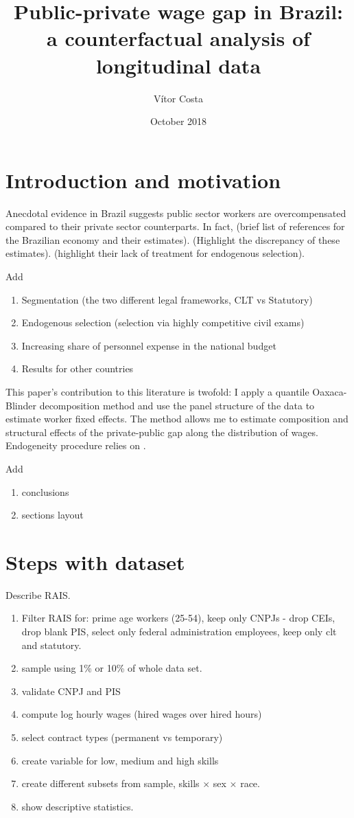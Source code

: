 \documentclass{article}
\title{Public-private wage gap in Brazil: a counterfactual analysis of longitudinal data}
\author{Vítor Costa}
\date{October 2018}
\begin{document}
\maketitle

\section{Introduction and motivation}
Anecdotal evidence in Brazil suggests public sector workers are overcompensated compared to their private sector counterparts. In fact, (brief list of references for the Brazilian economy and their estimates). (Highlight the discrepancy of these estimates). (highlight their lack of treatment for endogenous selection).

Add
\begin{enumerate}
    \item Segmentation (the two different legal frameworks, CLT vs Statutory)
    \item Endogenous selection (selection via highly competitive civil exams)
    \item Increasing share of personnel expense in the national budget 
    \item Results for other countries
\end{enumerate}


This paper's contribution to this literature is twofold: I apply a quantile Oaxaca-Blinder decomposition method and use the panel structure of the data to estimate worker fixed effects. The method allows me to estimate composition and structural effects of the private-public gap along the distribution of wages. Endogeneity procedure relies on \cite{canay_simple_2011}.  

Add 
\begin{enumerate}
    \item conclusions
    \item sections layout 
\end{enumerate}

\section{Steps with dataset}
Describe RAIS. 

\begin{enumerate}
    \item Filter RAIS for: prime age workers (25-54), keep only CNPJs - drop CEIs, drop blank PIS, select only federal administration employees, keep only clt and statutory.
    \item sample using 1\% or 10\% of whole data set.  
    \item validate CNPJ and PIS
    \item compute log hourly wages (hired wages over hired hours)
    \item select contract types (permanent vs temporary)
    \item create variable for low, medium and high skills
    \item create different subsets from sample, skills $\times$ sex $\times$ race.
    \item show descriptive statistics.
\end{enumerate}
\end{document}
